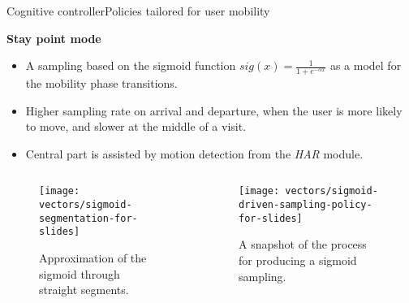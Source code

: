 \begin{frame}{Cognitive controller}{Policies tailored for user mobility}
\small
\begin{block}{\small \textbf{Stay point mode}}
  \begin{itemize}
      \item A sampling based on the sigmoid function $sig(x) = \frac{1}{1+e^{-\alpha x}}$ as a model for the mobility phase transitions.
      \item Higher sampling rate on arrival and departure, when the user is more likely to move, and slower at the middle of a visit.
      \item Central part is assisted by motion detection from the \emph{HAR} module.
  \end{itemize}
\end{block}

\begin{columns}
\begin{column}{0.45\textwidth}
\begin{figure}
  \centering
  \texttt{[image: vectors/sigmoid-segmentation-for-slides]}
  \caption{Approximation of the sigmoid through straight segments.}
\end{figure}
\end{column}

\begin{column}{0.55\textwidth}
\begin{figure}
  \centering
  \texttt{[image: vectors/sigmoid-driven-sampling-policy-for-slides]}
  \caption{A snapshot of the process for producing a sigmoid sampling.}
\end{figure}
\end{column}
\end{columns}
\end{frame}

